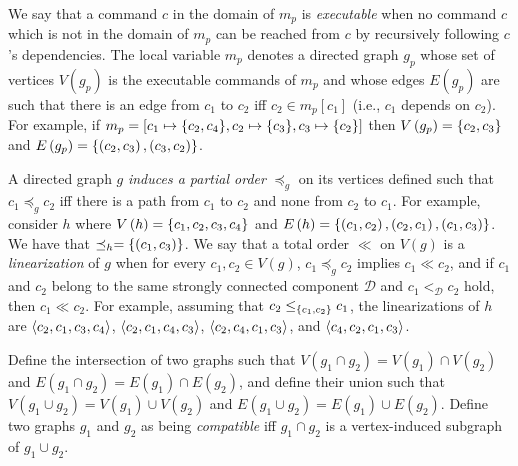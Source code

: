 We say that a command $c$ in the domain of $m_p$ is \emph{executable} when no command $c$ which is not in the domain of $m_p$ can be reached from $c$ by recursively following $c$'s dependencies.
The local variable $m_p$ denotes a directed graph $g_p$ whose set of vertices $V\left( g_p \right)$ is the executable commands of $m_p$ and whose edges $E\left( g_p \right)$ are such that there is an edge from $c_1$ to $c_2$ iff $c_2 \in m_p\left[ c_1 \right]$ (i.e., $c_1$ depends on $c_2$). For example, if $m_p = \left[ c_1 \mapsto \aset{c_2,c_4}, c_2 \mapsto \aset{c_3}, c_3 \mapsto \aset{c_2}\right]$ then $V\left( g_p \right) = \left\{c_2,c_3\right\}$ and $E\left( g_p \right) = \left\{\left( c_2,c_3 \right),\left( c_3,c_2 \right)\right\}$.

A directed graph $g$ \emph{induces a partial order} $\preceq_g$ on its vertices defined such that $c_1 \preceq_g c_2$ iff there is a path from $c_1$ to $c_2$ and none from $c_2$ to $c_1$.
For example, consider $h$ where $V\left( h \right)=\left\{c_1,c_2,c_3,c_4\right\}$ and $E\left( h \right)=\left\{\left( c_1,c_2 \right),\left( c_2,c_1 \right),\left( c_1,c_3 \right)\right\}$. 
We have that $\preceq_h = \left\{\left( c_1,c_3 \right)\right\}$.
We say that a total order $\ll$ on $V\left( g \right)$ is a \emph{linearization} of $g$ when for every $c_1,c_2\in V\left( g \right)$, $c_1 \preceq_g c_2$ implies $c_1 \ll c_2$, and if $c_1$ and $c_2$ belong to the same strongly connected component $\mathcal{D}$ and $ c_1 <_{\mathcal{D}} c_2$ hold, then $c_1 \ll c_2$. For example, assuming that $c_2 \leq_{\left\{c_1,c_2\right\}} c_1$, the linearizations of $h$ are $\left\langle c_2,c_1,c_3,c_4\right\rangle$, $\left\langle c_2,c_1,c_4,c_3\right\rangle$, $\left\langle c_2,c_4,c_1,c_3\right\rangle$, and $\left\langle c_4,c_2,c_1,c_3\right\rangle$.

\begin{comment}
We now define a partial order on graphs. If $g_1$ and $g_2$ are two graphs, then we write $g_1 \leq g_2$ iff $V\left( g_1 \right)\subseteq V\left( g_2 \right)$, and if $v\in V\left( g_1 \right)$, $e\in E\left( g_2 \right)$, and $v$ is an endpoint of $e$, then $e\in E\left( g_1 \right)$. 
For example, consider the graphs $h'$ and $h''$ such that $V\left( h' \right)=\aset{c_1,c_2,c_4}$, $E\left( h' \right)=\aset{\left( c_1,c_2 \right),\left( c_2,c_1 \right)}$, $V\left( h'' \right)=\aset{c_1,c_3,c_4}$, and $E\left( h'' \right)=\aset{\left( c_1,c_3 \right)}$. We have that $h'\leq h$, but $ h''\not\leq h$.
\end{comment}

Define the intersection of two graphs such that $V\left( g_1 \cap g_2 \right)=V\left( g_1 \right)\cap V\left( g_2 \right)$ and $E\left( g_1 \cap g_2 \right)= E\left( g_1 \right)\cap E\left( g_2 \right)$, and define their union such that $V\left( g_1 \cup g_2 \right)=V\left( g_1 \right)\cup V\left( g_2 \right)$ and $E\left( g_1 \cup g_2 \right)= E\left( g_1 \right)\cup E\left( g_2 \right)$.
Define two graphs $g_1$ and $g_2$ as being \emph{compatible} iff $g_1 \cap g_2$ is a vertex-induced subgraph of $g_1 \cup g_2$.

